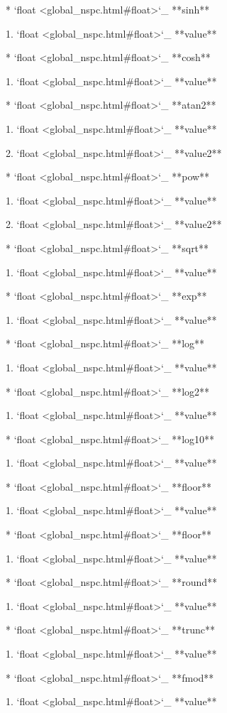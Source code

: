 	* `float <global_nspc.html#float>`_ **sinh**

		1. `float <global_nspc.html#float>`_ **value**

	* `float <global_nspc.html#float>`_ **cosh**

		1. `float <global_nspc.html#float>`_ **value**

	* `float <global_nspc.html#float>`_ **atan2**

		1. `float <global_nspc.html#float>`_ **value**

		2. `float <global_nspc.html#float>`_ **value2**

	* `float <global_nspc.html#float>`_ **pow**

		1. `float <global_nspc.html#float>`_ **value**

		2. `float <global_nspc.html#float>`_ **value2**

	* `float <global_nspc.html#float>`_ **sqrt**

		1. `float <global_nspc.html#float>`_ **value**

	* `float <global_nspc.html#float>`_ **exp**

		1. `float <global_nspc.html#float>`_ **value**

	* `float <global_nspc.html#float>`_ **log**

		1. `float <global_nspc.html#float>`_ **value**

	* `float <global_nspc.html#float>`_ **log2**

		1. `float <global_nspc.html#float>`_ **value**

	* `float <global_nspc.html#float>`_ **log10**

		1. `float <global_nspc.html#float>`_ **value**

	* `float <global_nspc.html#float>`_ **floor**

		1. `float <global_nspc.html#float>`_ **value**

	* `float <global_nspc.html#float>`_ **floor**

		1. `float <global_nspc.html#float>`_ **value**

	* `float <global_nspc.html#float>`_ **round**

		1. `float <global_nspc.html#float>`_ **value**

	* `float <global_nspc.html#float>`_ **trunc**

		1. `float <global_nspc.html#float>`_ **value**

	* `float <global_nspc.html#float>`_ **fmod**

		1. `float <global_nspc.html#float>`_ **value**

